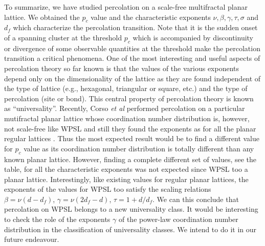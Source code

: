 ﻿\documentclass[twocolumn,showpacs,preprintnumbers,amsmath,amssymb]{revtex4}
\begin{document}
To summarize, we have studied percolation on a scale-free multifractal planar lattice. We obtained the $p_c$ value and
the characteristic exponents $\nu, \beta,\gamma, \tau, \sigma$ and $d_f$ which characterize the percolation transition.  
Note that it is the sudden onset of a spanning cluster at the threshold $p_c$ which is 
accompanied by discontinuity or divergence of 
some observable quantities at the threshold make the percolation transition a critical phenomena. One of the most interesting and useful
aspects of percolation theory so far known is that the values of the various exponents depend only on the dimensionality of the 
lattice as they are found independent of
the type of lattice (e.g., hexagonal, triangular or square, etc.) and the type of percolation (site or
bond).  This central property of percolation theory is known as “universality”. 
Recently, Corso {\it et al} performed percolation on 
a particular mutifractal planar lattice whose coordination number distribution is, however, not scale-free like
WPSL and still they found the exponents as for all the planar regular lattices \cite{ref.multifractal}. 
Thus the most expected result would be to find a different value for $p_c$ value as its coordination number
distribution is totally different than any known planar lattice. However, finding
a complete different set of values, see the table, for all the characteristic exponents was not expected since WPSL too a planar
lattice. Interestingly, like existing values for regular planar lattices, the exponents of the values for WPSL too satisfy the scaling relations $\beta=\nu(d- d_f)$, $\gamma=\nu(2d_f-d)$, $\tau=1+d/d_f$. 
We can this conclude that percolation on WPSL belongs to a new universality class. 
It would be interesting to check the role of the exponents $\gamma$ of the power-law coordination number distribution in the classification of universality classes. We intend to do it in our future endeavour.
\end{document}
